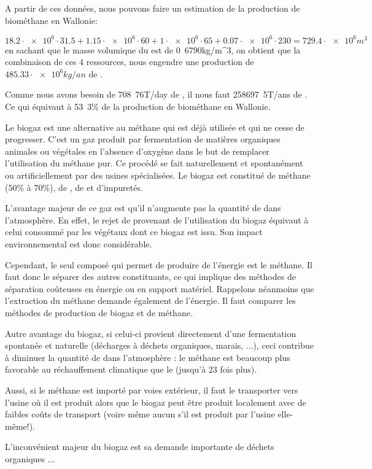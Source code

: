 \documentclass[10pt,a4paper]{article}
\begin{document}
A partir de ces données, nous pouvons faire un estimation de la production de biométhane en Wallonie:

$$18.2\cdot \num{e6} \cdot 31.5 + 1.15\cdot \num{e6} \cdot 60 + 1\cdot \num{e6} \cdot 65 + 0.07\cdot \num{e6} \cdot 230 = \unit{729.4\cdot \num{e6}}{m^3}$$ en sachant que le masse volumique du  est de \unit{0.6790}{kg/m^3},
on obtient que la combinaison de ces 4 ressources, nous engendre une production de $\unit{485.33 \cdot \num{e6}}{kg/an}$ de .

Comme nous avons besoin de \unit{708.76}{T/day} de , il nous faut \unit{258697.5}{T/ans} de . Ce qui équivaut à \unit{53.3}{\%} de la production de biométhane en Wallonie.

















\newpage

Le biogaz est une alternative au méthane qui est déjà utilisée et qui ne cesse de progresser. C'est un gaz produit par fermentation de matières organiques animales ou végétales en l'absence d'oxygène dans le but de remplacer l'utilisation du méthane pur. Ce procédé se fait naturellement et spontanément ou artificiellement par des usines spécialisées. Le biogaz est constitué de méthane (50\% à 70\%), de , de  et d'impuretés. 

L'avantage majeur de ce gaz est qu'il n'augmente pas la quantité de  dans l'atmosphère. En effet, le rejet de  provenant de l'utilisation du biogaz équivaut à celui consommé par les végétaux dont ce biogaz est issu. Son impact environnemental est donc considérable.

Cependant, le seul composé qui permet de produire de l'énergie est le méthane. Il faut donc le séparer des autres constituants, ce qui implique des méthodes de séparation coûteuses en énergie ou en support matériel. Rappelons néanmoins que l'extraction du méthane demande également de l'énergie. Il faut comparer les méthodes de production de biogaz et de méthane.

Autre avantage du biogaz, si celui-ci provient directement d'une fermentation spontanée et naturelle (décharges à déchets organiques, marais, ...), ceci contribue à diminuer la quantité de  dans l'atmosphère : le méthane est beaucoup plus favorable au réchauffement climatique que le  (jusqu'à 23 fois plus).

Aussi, si le méthane est importé par voies extérieur, il faut le transporter vers l'usine où il est produit alors que le biogaz peut être produit localement avec de faibles coûts de transport (voire même aucun s'il est produit par l'usine elle-même!).

L'inconvénient majeur du biogaz est sa demande importante de déchets organiques ...
\end{document}
